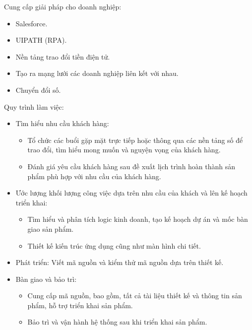 \documentclass[12pt,a4paper]{report}
\begin{document}
		\hspace{0.3cm} {Cung cấp giải pháp cho doanh nghiệp:}
			\begin{itemize}
				\item Salesforce.
				\item UIPATH (RPA).
				\item Nền tảng trao đổi tiền điện tử.
				\item Tạo ra mạng lưới các doanh nghiệp liên kết với nhau.
				\item Chuyển đổi số.
			\end{itemize}
		
		\hspace{0.3cm} {Quy trình làm việc:}
			\begin{itemize}
				\item Tìm hiểu nhu cầu khách hàng: 
					\begin{itemize}
						\item Tổ chức các buổi gặp mặt trực tiếp hoặc thông qua các nền tảng số để trao đổi, tìm hiểu mong muốn và nguyện vọng của khách hàng.
						\item Đánh giá yêu cầu khách hàng sau đề xuất lịch trình hoàn thành sản phẩm phù hợp với nhu cầu của khách hàng.
					\end{itemize}
				\item Ước lượng khối lượng công việc dựa trên nhu cầu của khách và lên kế hoạch triển khai:
					\begin{itemize}
						\item Tìm hiểu và phân tích logic kinh doanh, tạo kế hoạch dự án và mốc bàn giao sản phẩm.
						\item Thiết kế kiến trúc ứng dụng cũng như màn hình chi tiết.
					\end{itemize}
				\item Phát triển: Viết mã nguồn và kiểm thử mã nguồn dựa trên thiết kế.
				\item Bàn giao và bảo trì:
					\begin{itemize}
						\item Cung cấp mã nguồn, bao gồm, tất cả tài liệu thiết kế và thông tin sản phẩm, hỗ trợ triển khai sản phẩm.
						\item Bảo trì và vận hành hệ thống sau khi triển khai sản phẩm.
					\end{itemize}
			\end{itemize}
		
\end{document}
